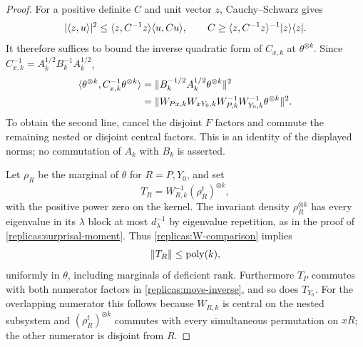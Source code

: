 \begin{proof}
For a positive definite $C$ and unit vector $z$, Cauchy--Schwarz gives
\[
 |\langle z,u\rangle|^2
 \le\langle z,C^{-1}z\rangle\langle u,Cu\rangle,
 \qquad
 C\ge\langle z,C^{-1}z\rangle^{-1}\lvert z\rangle\langle z\rvert.
\]
It therefore suffices to bound the inverse quadratic form of
$C_{x,k}$ at $\theta^{\otimes k}$.  Since
$C_{x,k}^{-1}=A_k^{1/2}B_k^{-1}A_k^{1/2}$,
\begin{equation}\label{replicas:move-inverse}
 \begin{split}
 \langle\theta^{\otimes k},C_{x,k}^{-1}\theta^{\otimes k}\rangle
 &=\lVert B_k^{-1/2}A_k^{1/2}\theta^{\otimes k}\rVert^2\\
 &=\lVert W_{Px,k}W_{xY_0,k}W_{P,k}^{-1}W_{Y_0,k}^{-1}
                                      \theta^{\otimes k}\rVert^2.
 \end{split}
\end{equation}
To obtain the second line, cancel the disjoint $F$ factors and commute
the remaining nested or disjoint central factors.  This is an
identity of the displayed norms; no commutation of $A_k$ with $B_k$
is asserted.

Let $\rho_R$ be the marginal of $\theta$ for $R=P,Y_0$, and set
\[
 T_R=W_{R,k}^{-1}(\rho_R^t)^{\otimes k},
\]
with the positive power zero on the kernel.  The invariant density
$\rho_R^{\otimes k}$ has every eigenvalue in its $\lambda$ block
at most $d_\lambda^{-1}$ by eigenvalue repetition, as in the proof
of \eqref{replicas:surprisal-moment}.  Thus
\eqref{replicas:W-comparison} implies
\begin{equation}\label{replicas:compensator}
 \lVert T_R\rVert\le\operatorname{poly}(k),
\end{equation}
uniformly in $\theta$, including marginals of deficient rank.
Furthermore $T_P$ commutes with both numerator factors in
\eqref{replicas:move-inverse}, and so does $T_{Y_0}$.
For the overlapping numerator this follows because $W_{R,k}$ is
central on the nested subsystem and $(\rho_R^t)^{\otimes k}$
commutes with every simultaneous permutation on $xR$; the other
numerator is disjoint from $R$.


\end{proof}
